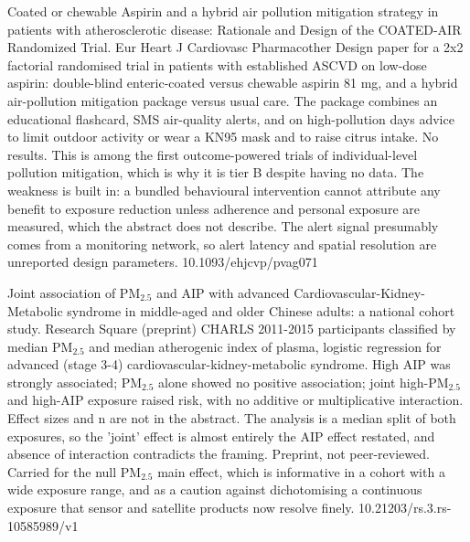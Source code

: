 \documentclass[10pt]{article}
\begin{document}

{Coated or chewable Aspirin and a hybrid air pollution mitigation strategy in patients with atherosclerotic disease: Rationale and Design of the COATED-AIR Randomized Trial.}
{Eur Heart J Cardiovasc Pharmacother}
{Design paper for a 2x2 factorial randomised trial in patients with established ASCVD on low-dose aspirin: double-blind enteric-coated versus chewable aspirin 81 mg, and a hybrid air-pollution mitigation package versus usual care. The package combines an educational flashcard, SMS air-quality alerts, and on high-pollution days advice to limit outdoor activity or wear a KN95 mask and to raise citrus intake. No results. This is among the first outcome-powered trials of individual-level pollution mitigation, which is why it is tier B despite having no data. The weakness is built in: a bundled behavioural intervention cannot attribute any benefit to exposure reduction unless adherence and personal exposure are measured, which the abstract does not describe. The alert signal presumably comes from a monitoring network, so alert latency and spatial resolution are unreported design parameters.}
{10.1093/ehjcvp/pvag071}

{Joint association of PM$_{2.5}$ and AIP with advanced Cardiovascular-Kidney-Metabolic syndrome in middle-aged and older Chinese adults: a national cohort study.}
{Research Square (preprint)}
{CHARLS 2011-2015 participants classified by median PM$_{2.5}$ and median atherogenic index of plasma, logistic regression for advanced (stage 3-4) cardiovascular-kidney-metabolic syndrome. High AIP was strongly associated; PM$_{2.5}$ alone showed no positive association; joint high-PM$_{2.5}$ and high-AIP exposure raised risk, with no additive or multiplicative interaction. Effect sizes and n are not in the abstract. The analysis is a median split of both exposures, so the 'joint' effect is almost entirely the AIP effect restated, and absence of interaction contradicts the framing. Preprint, not peer-reviewed. Carried for the null PM$_{2.5}$ main effect, which is informative in a cohort with a wide exposure range, and as a caution against dichotomising a continuous exposure that sensor and satellite products now resolve finely.}
{10.21203/rs.3.rs-10585989/v1}

\end{document}
